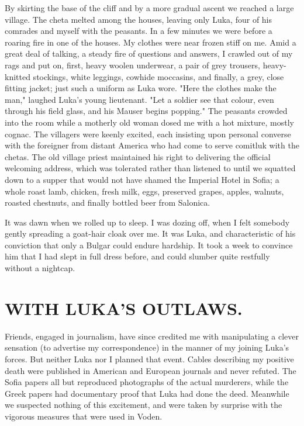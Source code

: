 \documentclass[a5paper,12pt]{book}
\begin{document}
By skirting the base of the cliff and by a more gradual ascent we reached a large village. The cheta melted among the houses, leaving only Luka, four of his comrades and myself with the peasants. In a few minutes we were before a roaring fire in one of the houses. My clothes were near frozen stiff on me. Amid a great deal of talking, a steady fire of questions and answers, I crawled out of my rags and put on, first, heavy woolen underwear, a pair of grey trousers, heavy-knitted stockings, white leggings, cowhide moccasins, and finally, a grey, close fitting jacket; just such a uniform as Luka wore.
"Here the clothes make the man," laughed Luka’s young lieutenant. "Let a soldier see that colour, even through his field glass, and his Mauser begins popping." The peasants crowded into the room while a motherly old woman dosed me with a hot mixture, mostly cognac. The villagers were keenly excited, each insisting upon personal converse with the foreigner from distant America who had come to serve comitluk with the chetas. The old village priest maintained his right to delivering the official welcoming address, which was tolerated rather than listened to until we squatted down to a supper that would not have shamed the Imperial Hotel in Sofia; a whole roast lamb, chicken, fresh milk, eggs, preserved grapes, apples, walnuts, roasted chestnuts, and finally bottled beer from Salonica.

It was dawn when we rolled up to sleep. I was dozing off, when I felt somebody gently spreading a goat-hair cloak over me. It was Luka, and characteristic of his conviction that only a Bulgar could endure hardship. It took a week to convince him that I had slept in full dress before, and could slumber quite restfully without a nightcap.



\chapter{WITH LUKA’S OUTLAWS.}

Friends, engaged in journalism, have since credited me with manipulating a clever sensation (to advertise my correspondence) in the manner of my joining Luka’s forces. But neither Luka nor I planned that event. Cables describing my positive death were published in American and European journals and never refuted. The Sofia papers all but reproduced photographs of the actual murderers, while the Greek papers had documentary proof that Luka had done the deed. Meanwhile we suspected nothing of this excitement, and were taken by surprise with the vigorous measures that were used in Voden.
\end{document}
